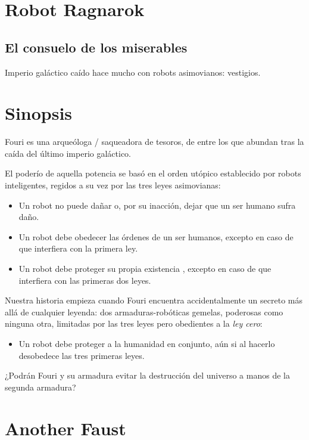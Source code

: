 \documentclass[letterpaper,12pt]{article}
\begin{document}
	\newpage
	
	\section*{Robot Ragnarok}
	
	\subsection*{El consuelo de los miserables}	
	
	Imperio galáctico caído hace mucho con robots asimovianos: vestigios.
	
	\section*{Sinopsis}
	
	Fouri es una arqueóloga / saqueadora de tesoros, de entre los que abundan tras la caída
	del último imperio galáctico. 
	
	El poderío de aquella potencia se basó en 
	el orden utópico establecido por robots inteligentes, regidos a su vez
	por las tres leyes asimovianas:
	\begin{itemize}
		\item Un robot no puede dañar o, por su inacción, dejar
		que un ser humano sufra daño.
		\item Un robot debe obedecer las órdenes de un ser humanos, excepto
		en caso de que interfiera con la primera ley.
		\item Un robot debe proteger su propia existencia , excepto en caso
		de que interfiera con las primeras dos leyes.
	\end{itemize}
	
	Nuestra historia empieza cuando Fouri encuentra accidentalmente un secreto
	más allá de cualquier leyenda: dos armaduras-robóticas gemelas,
	poderosas como ninguna otra, limitadas por las tres leyes pero obedientes a la 
	\textit{ley cero}:
	\begin{itemize}
		\item Un robot debe proteger a la humanidad en conjunto, aún si al hacerlo
		desobedece las tres primeras leyes.
	\end{itemize}
	
	¿Podrán Fouri y su armadura evitar la destrucción del universo a manos de la segunda armadura?
	
	\newpage
	
	\section*{Another Faust}
	
\end{document}
